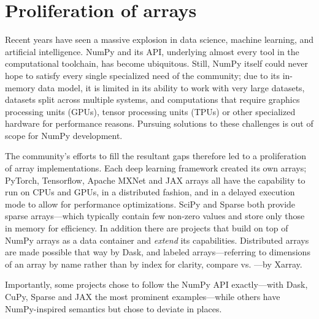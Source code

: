 \section*{Proliferation of arrays}


Recent years have seen a massive explosion in data science, machine learning,
and artificial intelligence.  NumPy and its API, underlying almost every tool
in the computational toolchain, has become ubiquitous.  Still, NumPy itself
could never hope to satisfy every single specialized need of the community;
due to its in-memory data model, it is limited in its ability to work with very
large datasets, datasets split across multiple systems, and computations that
require graphics processing units (GPUs), tensor processing units (TPUs) or
other specialized hardware for performance reasons.  Pursuing solutions to
these challenges is out of scope for NumPy development.

The community's efforts to fill the resultant gaps therefore led to a
proliferation of array implementations. Each deep learning framework created
its own arrays; PyTorch, Tensorflow, Apache MXNet and JAX arrays all have the
capability to run on CPUs and GPUs, in a distributed fashion, and in a delayed
execution mode to allow for performance optimizations.  SciPy and Sparse both
provide sparse arrays---which typically contain few non-zero values and store
only those in memory for efficiency.
In addition there are projects that build on top of NumPy arrays as a data
container and \textit{extend} its capabilities.  Distributed arrays are
made possible that way by Dask, and labeled arrays---referring to dimensions of
an array by name rather than by index for clarity, compare  vs.
---by Xarray.

Importantly, some projects chose to follow the NumPy API exactly---with Dask,
CuPy, Sparse and JAX the most prominent examples---while others have
NumPy-inspired semantics but chose to deviate in places.




